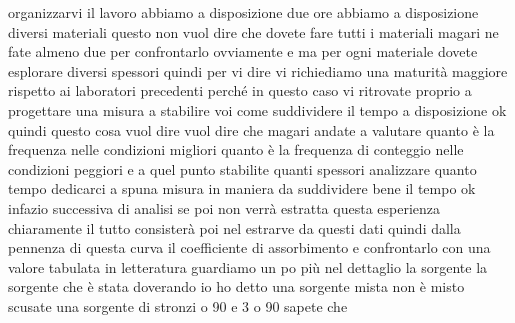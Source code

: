 organizzarvi il lavoro abbiamo a disposizione due ore abbiamo a disposizione diversi materiali questo non vuol dire che dovete fare tutti i materiali magari ne fate almeno due per confrontarlo ovviamente e ma per ogni materiale dovete esplorare diversi spessori quindi per vi dire vi richiediamo una maturità maggiore rispetto ai laboratori precedenti perché in questo caso vi ritrovate proprio a progettare una misura a stabilire voi come suddividere il tempo a disposizione ok quindi questo cosa vuol dire vuol dire che magari andate a valutare quanto è la frequenza nelle condizioni migliori quanto è la frequenza di conteggio nelle condizioni peggiori e a quel punto stabilite quanti spessori analizzare quanto tempo dedicarci a spuna misura in maniera da suddividere bene il tempo ok infazio successiva di analisi se poi non verrà estratta questa esperienza chiaramente il tutto consisterà poi nel estrarve da questi dati quindi dalla pennenza di questa curva il coefficiente di assorbimento e confrontarlo con una valore tabulata in letteratura guardiamo un po più nel dettaglio la sorgente la sorgente che è stata doverando io ho detto una sorgente mista non è misto scusate una sorgente di stronzi o 90 e 3 o 90 sapete che

